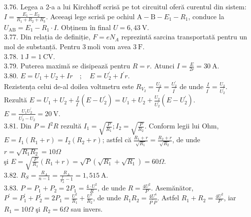 3.76. Legea a 2-a a lui Kirchhoff scrisă pe tot circuitul oferă curentul din sistem: $I=\frac{E_{1}-E_{2}}{R_{1}+R_{2}+R_{3}}$. Aceeaşi lege scrisă pe ochiul $\mathrm{A}-\mathrm{B}-E_{1}-R_{1}$, conduce la $U_{\mathrm{AB}}=E_{1}-R_{1} \cdot I$. Obținem în final $U=6,43 \mathrm{~V}$.\\

3.77. Din relația de definiție, $F=e N_{A}$ reprezintă sarcina transportată pentru un mol de substanță. Pentru $3 \mathrm{~moli}$ vom avea $3 \mathrm{~F}$.\\

3.78. $1 \mathrm{~J}=1 \mathrm{~CV}$.\\

3.79. Puterea maximă se disipează pentru $R=r$. Atunci $I=\frac{E}{2 r}=30 \mathrm{~A}$.\\

3.80. $E=U_{1}+U_{2}+I r \quad ; \quad E=U_{2}^{\prime}+I^{\prime} r$.\\ Rezistența celui de-al doilea voltmetru este $R_{V_{2}}=\frac{U_{2}}{I}=\frac{U_{2}^{\prime}}{I^{\prime}}$ de unde $\frac{I}{I^{\prime}}=\frac{U_{2}}{U_{2}^{\prime}}$. Rezultă $E=U_{1}+U_{2}+\frac{I}{I^{\prime}}\left(E-U_{2}^{\prime}\right)=U_{1}+U_{2}+\frac{U_{2}}{U_{2}^{\prime}}\left(E-U_{2}^{\prime}\right)$.\\ $E=\frac{U_{1} U_{2}^{\prime}}{U_{2}^{\prime}-U_{2}}=20 \mathrm{~V}.$\\

3.81. Din $P=I^{2} R$ rezultă $I_{1}=\sqrt{\frac{P}{R_{1}}} ; I_{2}=\sqrt{\frac{P}{R_{2}}}$. Conform legii lui Ohm, $E=I_{1}\left(R_{1}+r\right)=I_{2}\left(R_{2}+r\right)$; astfel că $\frac{R_{1}+r}{\sqrt{R_{1}}}=\frac{R_{2}+r}{\sqrt{R_{2}}}$, de unde $r=\sqrt{R_{1} R_{2}}=10 \Omega$\\ şi $E=\sqrt{\frac{P}{R_{1}}}\left(R_{1}+r\right)=\sqrt{P}\left(\sqrt{R_{1}}+\sqrt{R_{1}}\right)=60 \Omega$.\\

3.82. $R_{S}=\frac{R_{A}}{n-1}=\frac{R_{A}}{\frac{I}{I_{A}}-1}=1,515 \mathrm{~A}$.\\

3.83. $P=P_{1}+P_{2}=2 P_{1}=\frac{4 \cdot U^{2}}{R}$, de unde $R=\frac{4 U^{2}}{P}$. Asemănător, $P^{\prime}=P_{1}^{\prime}+P_{2}^{\prime}=2 P_{1}=\frac{U^{2}}{R_{1}}+\frac{U^{2}}{R_{2}}$, de unde $R_{1} R_{2}=\frac{4 U^{4}}{P^{\prime} P}$. Astfel $R_{1}+R_{2}=\frac{4 U^{2}}{P}$, iar $R_{1}=10 \Omega$ şi $R_{2}=6 \Omega$ sau invers.\\

